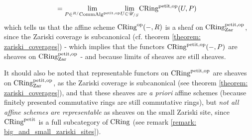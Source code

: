 \begin{remark}
$$\begin{aligned}
                                \\
                                & = \underset{P \in {}^{R/}\mathrm{Comm}\mathrm{Alg}^{\mathrm{petit}, \mathrm{op}}}{\operatorname{lim}} \underset{U \in \mathscr{U}_{/S}}{\operatorname{lim}} \mathrm{CRing}^{\mathrm{petit}, \mathrm{op}}(U, P)
                            \end{aligned}
                        $$
                    which tells us that the affine scheme $\mathrm{CRing}^{\mathrm{op}}(-, R)$ is a sheaf on $\mathrm{CRing}^{\mathrm{petit}, \mathrm{op}}_{\mathrm{Zar}}$, since the Zariski coverage is subcanonical (cf. theorem \ref{theorem: zariski_coverages}) - which implies that the functors $\mathrm{CRing}^{\mathrm{petit}, \mathrm{op}}(-, P)$ are sheaves on $\mathrm{CRing}^{\mathrm{petit}, \mathrm{op}}_{\mathrm{Zar}}$ - and because limits of sheaves are still sheaves. 
                    
                    It should also be noted that representable functors on $\mathrm{CRing}^{\mathrm{petit}, \mathrm{op}}$ are sheaves on $\mathrm{CRing}^{\mathrm{petit}, \mathrm{op}}_{\mathrm{Zar}}$, as the Zariski coverage is subcanonical (see theorem \ref{theorem: zariski_coverages}), and that these sheaves are \textit{a priori} affine schemes (because finitely presented commutative rings are still commutative rings), but \textit{not all affine schemes are representable} as sheaves on the small Zariski site, since $\mathrm{CRing}^{\mathrm{petit}}$ is a full subcategory of $\mathrm{CRing}$ (see remark \ref{remark: big_and_small_zariski_sites}).
                \end{remark}
                
